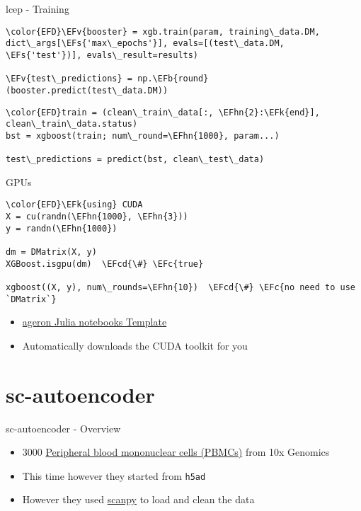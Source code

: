 \documentclass[bigger]{beamer}
\newcommand{\EFc}[1]{\textcolor{EFc}{#1}} %
\newcommand{\EFcd}[1]{\textcolor{EFcd}{#1}} %
\newcommand{\EFs}[1]{\textcolor{EFs}{#1}} %
\newcommand{\EFk}[1]{\textcolor{EFk}{#1}} %
\newcommand{\EFb}[1]{\textcolor{EFb}{#1}} %
\newcommand{\EFv}[1]{\textcolor{EFv}{#1}} %
\newcommand{\EFhn}[1]{\textcolor{EFhn}{\textbf{#1}}} %
\begin{document}
\begin{frame}[label={sec:org76252bc},fragile]{lcep - Training}
 \small
\begin{Code}
\begin{Verbatim}
\color{EFD}\EFv{booster} = xgb.train(param, training\_data.DM, dict\_args[\EFs{'max\_epochs'}], evals=[(test\_data.DM, \EFs{'test'})], evals\_result=results)

\EFv{test\_predictions} = np.\EFb{round}(booster.predict(test\_data.DM))
\end{Verbatim}
\end{Code}

\begin{Code}
\begin{Verbatim}
\color{EFD}train = (clean\_train\_data[:, \EFhn{2}:\EFk{end}], clean\_train\_data.status)
bst = xgboost(train; num\_round=\EFhn{1000}, param...)

test\_predictions = predict(bst, clean\_test\_data)
\end{Verbatim}
\end{Code}
\end{frame}

\begin{frame}[label={sec:org857c92b},fragile]{GPUs}
 \begin{Code}
\begin{Verbatim}
\color{EFD}\EFk{using} CUDA
X = cu(randn(\EFhn{1000}, \EFhn{3}))
y = randn(\EFhn{1000})

dm = DMatrix(X, y)
XGBoost.isgpu(dm)  \EFcd{\#} \EFc{true}

xgboost((X, y), num\_rounds=\EFhn{10})  \EFcd{\#} \EFc{no need to use `DMatrix`}
\end{Verbatim}
\end{Code}

\begin{itemize}
\item \href{https://github.com/ageron/julia\_notebooks/blob/main/Julia\_Colab\_Notebook\_Template.ipynb}{ageron Julia notebooks Template}
\item Automatically downloads the CUDA toolkit for you
\end{itemize}
\end{frame}

\section*{sc-autoencoder}
\label{sec:org80d8ca5}
\begin{frame}[label={sec:org40f46d6},fragile]{sc-autoencoder - Overview}
 \begin{itemize}
\item 3000 \href{https://support.10xgenomics.com/single-cell-gene-expression/datasets/1.1.0/pbmc3k}{Peripheral blood mononuclear cells (PBMCs)} from 10x Genomics
\item This time however they started from \texttt{h5ad}
\item However they used \href{https://scanpy.readthedocs.io/en/stable/}{scanpy} to load and clean the data
\end{itemize}
\end{frame}
\end{document}
